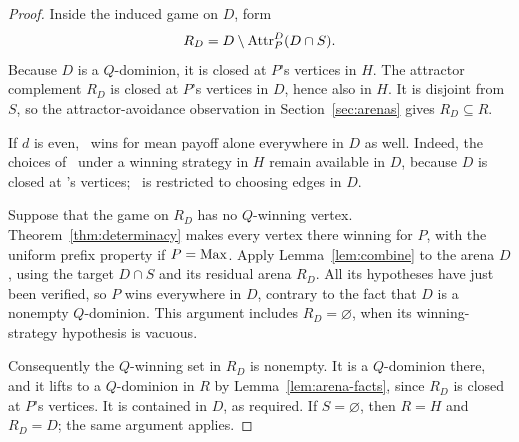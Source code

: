 \begin{proof}
Inside the induced game on $D$, form
\[
  R_D=D\setminus\operatorname{Attr}_P^D(D\cap S).
\]
Because $D$ is a $Q$-dominion, it is closed at $P$'s vertices in $H$.
The attractor complement $R_D$ is closed at $P$'s vertices in $D$, hence
also in $H$.  It is disjoint from $S$, so the attractor-avoidance
observation in Section~\ref{sec:arenas} gives $R_D\subseteq R$.

If $d$ is even, \Max\ wins for mean payoff alone everywhere in $D$ as
well.  Indeed, the choices of \Max\ under a winning strategy in $H$ remain
available in $D$, because $D$ is closed at \Max's vertices; \Min\ is
restricted to choosing edges in $D$.

Suppose that the game on $R_D$ has no $Q$-winning vertex.
Theorem~\ref{thm:determinacy} makes every vertex there winning for $P$,
with the uniform prefix property if $P=\mathrm{Max}$.  Apply
Lemma~\ref{lem:combine} to the arena $D$, using the target $D\cap S$
and its residual arena $R_D$.  All its hypotheses have just been
verified, so $P$ wins everywhere in $D$, contrary to the fact that $D$
is a nonempty $Q$-dominion.  This argument includes $R_D=\varnothing$,
when its winning-strategy hypothesis is vacuous.

Consequently the $Q$-winning set in $R_D$ is nonempty.  It is a
$Q$-dominion there, and it lifts to a $Q$-dominion in $R$ by
Lemma~\ref{lem:arena-facts}, since $R_D$ is closed at $P$'s vertices.
It is contained in $D$, as required.  If $S=\varnothing$, then
$R=H$ and $R_D=D$; the same argument applies.
\end{proof}
